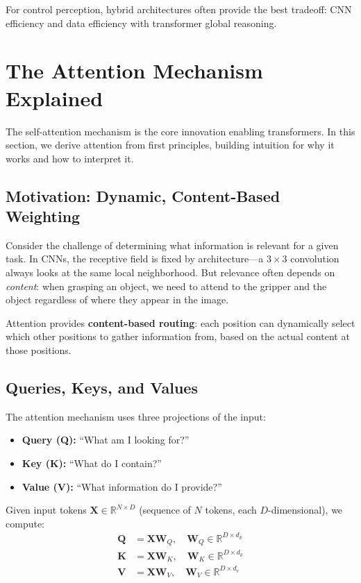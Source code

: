 For control perception, hybrid architectures often provide the best tradeoff: CNN efficiency and data efficiency with transformer global reasoning.

\section{The Attention Mechanism Explained}
\label{sec:attention_mechanism}

The self-attention mechanism is the core innovation enabling transformers. In this section, we derive attention from first principles, building intuition for why it works and how to interpret it.

\subsection{Motivation: Dynamic, Content-Based Weighting}

Consider the challenge of determining what information is relevant for a given task. In CNNs, the receptive field is fixed by architecture---a $3 \times 3$ convolution always looks at the same local neighborhood. But relevance often depends on \textit{content}: when grasping an object, we need to attend to the gripper and the object regardless of where they appear in the image.

Attention provides \textbf{content-based routing}: each position can dynamically select which other positions to gather information from, based on the actual content at those positions.

\subsection{Queries, Keys, and Values}

The attention mechanism uses three projections of the input:

\begin{itemize}
    \item \textbf{Query (Q):} ``What am I looking for?''
    \item \textbf{Key (K):} ``What do I contain?''
    \item \textbf{Value (V):} ``What information do I provide?''
\end{itemize}

Given input tokens $\mathbf{X} \in \mathbb{R}^{N \times D}$ (sequence of $N$ tokens, each $D$-dimensional), we compute:
\begin{align}
\mathbf{Q} &= \mathbf{X} \mathbf{W}_Q, \quad \mathbf{W}_Q \in \mathbb{R}^{D \times d_k} \label{eq:query} \\
\mathbf{K} &= \mathbf{X} \mathbf{W}_K, \quad \mathbf{W}_K \in \mathbb{R}^{D \times d_k} \label{eq:key} \\
\mathbf{V} &= \mathbf{X} \mathbf{W}_V, \quad \mathbf{W}_V \in \mathbb{R}^{D \times d_v} \label{eq:value}
\end{align}

